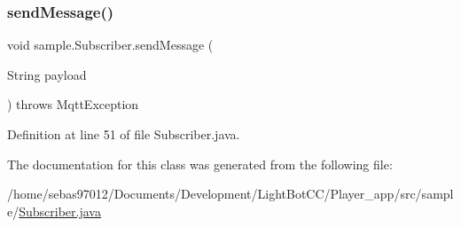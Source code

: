 \subsubsection{\texorpdfstring{send\+Message()}{sendMessage()}}
{\footnotesize\ttfamily void sample.\+Subscriber.\+send\+Message (\begin{DoxyParamCaption}\item[{String}]{payload }\end{DoxyParamCaption}) throws Mqtt\+Exception\hspace{0.3cm}{\ttfamily [inline]}}



Definition at line 51 of file Subscriber.\+java.



The documentation for this class was generated from the following file\+:\begin{DoxyCompactItemize}
\item 
/home/sebas97012/\+Documents/\+Development/\+Light\+Bot\+C\+C/\+Player\+\_\+app/src/sample/\mbox{\hyperlink{_player__app_2src_2sample_2_subscriber_8java}{Subscriber.\+java}}\end{DoxyCompactItemize}
